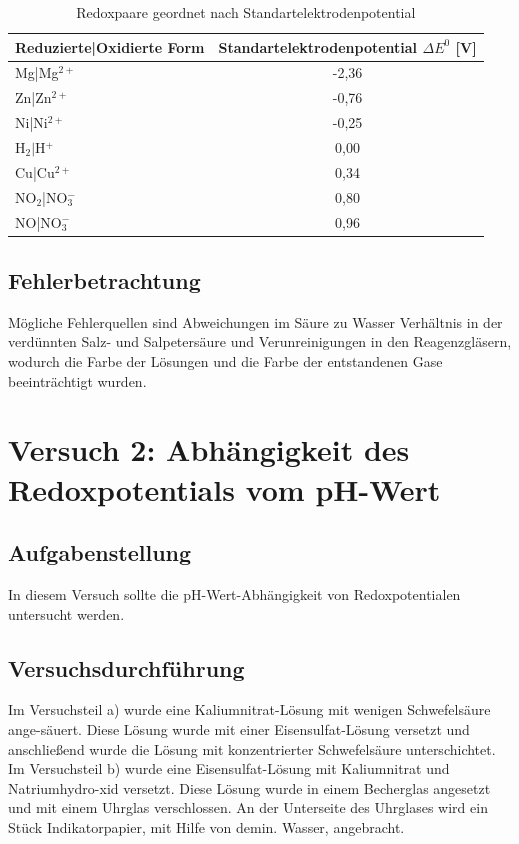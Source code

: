 \documentclass[12pt]{scrartcl} %
\begin{document}
\begin{table}[H]
\centering
\caption{Redoxpaare geordnet nach Standartelektrodenpotential }
\label{Redoxpaare  deltaE0}
\begin{tabular}{l c}
\toprule
Reduzierte|Oxidierte Form & Standartelektrodenpotential $\Delta E^0$ [V]\\ \midrule
Mg|Mg$^{2+}$ & -2,36 \\
Zn|Zn$^{2+}$ & -0,76 \\
Ni|Ni$^{2+}$ & -0,25 \\
H$_2|$H$^+$ & 0,00 \\
Cu|Cu$^{2+}$ & 0,34 \\
NO$_2$|NO$_3^-$ & 0,80 \\
NO|NO$_3^-$ & 0,96 \\ \bottomrule
\end{tabular}
\end{table}


\subsection{Fehlerbetrachtung}
Mögliche Fehlerquellen sind Abweichungen im Säure zu Wasser Verhältnis in der verdünnten Salz- und Salpetersäure und Verunreinigungen in den Reagenzgläsern, wodurch die Farbe der Lösungen und die Farbe der entstandenen Gase beeinträchtigt wurden.


\section{Versuch 2: Abhängigkeit des Redoxpotentials vom pH-Wert}

\subsection{Aufgabenstellung}
In diesem Versuch sollte die pH-Wert-Abhängigkeit von Redoxpotentialen untersucht werden.



\subsection{Versuchsdurchführung}
Im Versuchsteil a) wurde eine Kaliumnitrat-Lösung mit wenigen Schwefelsäure ange-säuert. Diese Lösung wurde mit einer Eisensulfat-Lösung versetzt und anschließend wurde die Lösung mit konzentrierter Schwefelsäure unterschichtet.\\
Im Versuchsteil b) wurde eine Eisensulfat-Lösung mit Kaliumnitrat und Natriumhydro-xid versetzt. Diese Lösung wurde in einem Becherglas angesetzt und mit einem Uhrglas verschlossen. An der Unterseite des Uhrglases wird ein Stück Indikatorpapier, mit Hilfe von demin. Wasser, angebracht.
\end{document}
